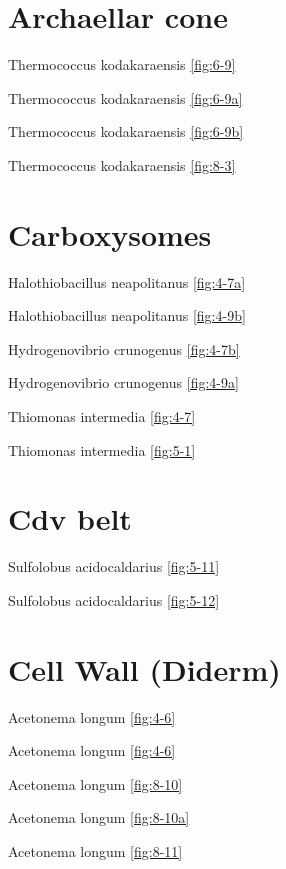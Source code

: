 \documentclass[]{tufte-book}
\begin{document}
\hypertarget{archaellar-cone}{%
\section*{Archaellar cone}\label{archaellar-cone}}

Thermococcus kodakaraensis \ref{fig:6-9}

Thermococcus kodakaraensis \ref{fig:6-9a}

Thermococcus kodakaraensis \ref{fig:6-9b}

Thermococcus kodakaraensis \ref{fig:8-3}

\hypertarget{carboxysomes-1}{%
\section*{Carboxysomes}\label{carboxysomes-1}}

Halothiobacillus neapolitanus \ref{fig:4-7a}

Halothiobacillus neapolitanus \ref{fig:4-9b}

Hydrogenovibrio crunogenus \ref{fig:4-7b}

Hydrogenovibrio crunogenus \ref{fig:4-9a}

Thiomonas intermedia \ref{fig:4-7}

Thiomonas intermedia \ref{fig:5-1}

\hypertarget{cdv-belt}{%
\section*{Cdv belt}\label{cdv-belt}}

Sulfolobus acidocaldarius \ref{fig:5-11}

Sulfolobus acidocaldarius \ref{fig:5-12}

\hypertarget{cell-wall-diderm}{%
\section*{Cell Wall (Diderm)}\label{cell-wall-diderm}}

Acetonema longum \ref{fig:4-6}

Acetonema longum \ref{fig:4-6}

Acetonema longum \ref{fig:8-10}

Acetonema longum \ref{fig:8-10a}

Acetonema longum \ref{fig:8-11}
\end{document}
